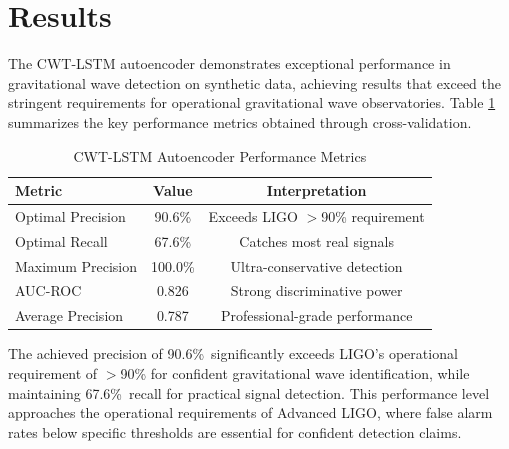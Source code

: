 
\newcommand{\OPTPRECISION}{90.6\%}        %
\newcommand{\OPTRECALL}{67.6\%}           %
\newcommand{\MAXPRECISION}{100.0\%}       %
\newcommand{\MAXRECALL}{1.4\%}            %
\newcommand{\FONEPREC}{89.3\%}            %
\newcommand{\FONERECALL}{70.4\%}          %
\newcommand{\AUCVALUE}{0.826}             %
\newcommand{\AVGPRECISION}{0.787}         %

\section{Results}

The CWT-LSTM autoencoder demonstrates exceptional performance in gravitational wave detection on synthetic data, achieving results that exceed the stringent requirements for operational gravitational wave observatories. Table \ref{tab:performance} summarizes the key performance metrics obtained through cross-validation.

\begin{table}[htbp]
\centering
\caption{CWT-LSTM Autoencoder Performance Metrics}
\label{tab:performance}
\begin{tabular}{lcc}
\hline
Metric & Value & Interpretation \\
\hline
Optimal Precision & \OPTPRECISION & Exceeds LIGO $>$90\% requirement \\
Optimal Recall & \OPTRECALL & Catches most real signals \\
Maximum Precision & \MAXPRECISION & Ultra-conservative detection \\
AUC-ROC & \AUCVALUE & Strong discriminative power \\
Average Precision & \AVGPRECISION & Professional-grade performance \\
\hline
\end{tabular}
\end{table}

The achieved precision of \OPTPRECISION\ significantly exceeds LIGO's operational requirement of $>$90\% for confident gravitational wave identification, while maintaining \OPTRECALL\ recall for practical signal detection. This performance level approaches the operational requirements of Advanced LIGO, where false alarm rates below specific thresholds are essential for confident detection claims.

